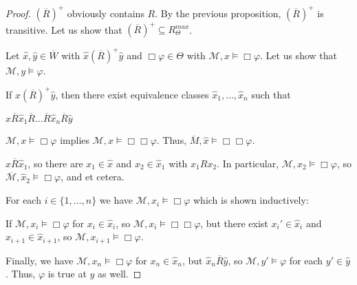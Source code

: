 \documentclass[a4paper]{article}
\theoremstyle{defin}
\theoremstyle{theorem}
\theoremstyle{prop}
\theoremstyle{lemma}
\theoremstyle{fact}
\theoremstyle{ex}
\theoremstyle{col}
\begin{document}
\begin{proof}
  $(\overline{R})^{+}$ obviously contains $R$. By the previous proposition, $(\overline{R})^{+}$ is transitive.
  Let us show that $(\overline{R})^{+} \subseteq R^{max}_{\Theta}$.

  Let $\hat{x}, \hat{y} \in \overline{W}$ with $\hat{x} (\overline{R})^{+} \hat{y}$ and
  $\Box \varphi \in \Theta$ with $\mathcal{M}, x \models \Box \varphi$. Let us show that $\mathcal{M}, y \models \varphi$.

  If $\hat{x} (\overline{R})^{+} \hat{y}$, then there exist equivalence classes $\hat{x}_1, \dots, \hat{x}_n$ such that
  \begin{center}
    $\hat{x} \overline{R} \hat{x}_1 \overline{R} \dots \overline{R} \hat{x}_n \overline{R} \hat{y}$
  \end{center}

  $\mathcal{M}, x \models \Box \varphi$ implies $\mathcal{M}, x \models \Box \Box \varphi$. Thus, $\overline{M}, \hat{x} \models \Box \Box \varphi$.

  $\hat{x} \overline{R} \hat{x}_1$, so there are $x_1 \in \hat{x}$ and $x_2 \in \hat{x}_1$ with $x_1 R x_2$. In particular, $\mathcal{M}, x_2 \models \Box \varphi$,
  so $\overline{\mathcal{M}}, \hat{x}_2 \models \Box \varphi$, and et cetera.

  For each $i \in \{1, \dots, n\}$ we have $\mathcal{M}, x_i \models \Box \varphi$ which is shown inductively:

  If $\mathcal{M}, x_i \models \Box \varphi$ for $x_i \in \hat{x}_i$, so $\mathcal{M}, x_i \models \Box \Box \varphi$, but there exist ${x_i}' \in \hat{x}_i$ and $x_{i + 1} \in \hat{x}_{i + 1}$, so
  $\mathcal{M}, x_{i + 1} \models \Box \varphi$.

  Finally, we have $\mathcal{M}, x_n \models \Box \varphi$ for $x_n \in \hat{x}_n$, but $\hat{x}_n \overline{R} \hat{y}$, so $\mathcal{M}, y' \models \varphi$ for each $y' \in \hat{y}$. Thus, $\varphi$ is true at $y$ as well.
\end{proof}
\end{document}
